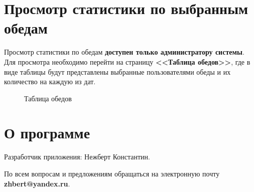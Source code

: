 \documentclass[a4paper]{article}
\begin{document}
\section{Просмотр статистики по выбранным обедам}

Просмотр статистики по обедам \textbf{доступен только администратору системы}. Для просмотра необходимо перейти на страницу \textbf{<<Таблица обедов>>}, где в виде таблицы будут представлены выбранные пользователями обеды и их количество на каждую из дат.

\begin{figure}[h]
\caption{Таблица обедов}
\label{fig:image32}
\end{figure}

\newpage
\section{О программе}

Разработчик приложения: Нежберт Константин.

По всем вопросам и предложениям обращаться на электронную почту \\
\textbf{zhbert@yandex.ru}.
\end{document}
